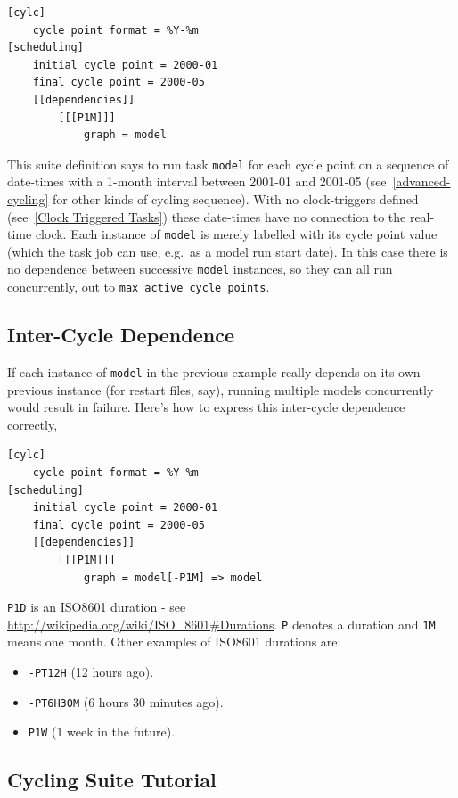 \begin{lstlisting}[language=suiterc]
[cylc]
    cycle point format = %Y-%m
[scheduling]
    initial cycle point = 2000-01
    final cycle point = 2000-05
    [[dependencies]]
        [[[P1M]]]
            graph = model
\end{lstlisting}
This suite definition says to run task \lstinline=model= for each cycle point
on a sequence of date-times with a 1-month interval between 2001-01 and 2001-05 
(see~\ref{advanced-cycling} for other kinds of cycling sequence).
With no clock-triggers defined (see~\ref{Clock Triggered Tasks}) these
date-times have no connection to the real-time clock.  Each instance of
\lstinline=model= is merely labelled with its cycle point value (which the task
job can use, e.g.\ as a model run start date).  In this case
there is no dependence between successive \lstinline=model= instances, so they
can all run concurrently, out to \lstinline=max active cycle points=.

\subsection{Inter-Cycle Dependence}

If each instance of \lstinline=model= in the previous example really depends
on its own previous instance (for restart files, say), running multiple
models concurrently would result in failure.  Here's how to express this
inter-cycle dependence correctly,

\begin{lstlisting}[language=suiterc]
[cylc]
    cycle point format = %Y-%m
[scheduling]
    initial cycle point = 2000-01
    final cycle point = 2000-05
    [[dependencies]]
        [[[P1M]]]
            graph = model[-P1M] => model
\end{lstlisting}

\lstinline=P1D= is an ISO8601 duration - see
    \url{http://wikipedia.org/wiki/ISO_8601#Durations}. \lstinline=P= denotes a
    duration and \lstinline=1M= means one month. Other examples of ISO8601
    durations are:
\begin{itemize}
    \item \lstinline{-PT12H} (12 hours ago).
    \item \lstinline{-PT6H30M} (6 hours 30 minutes ago).
    \item \lstinline{P1W} (1 week in the future).
\end{itemize}

\subsection{Cycling Suite Tutorial}

